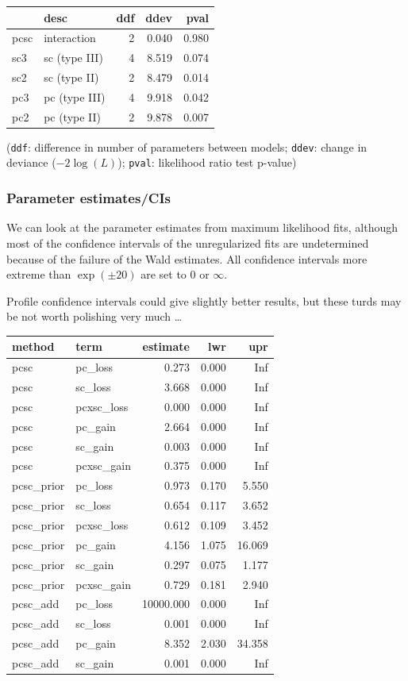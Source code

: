 \documentclass[
]{article}
\begin{document}
\begin{longtable}[]{@{}llrrr@{}}
\toprule()
& desc & ddf & ddev & pval \\
\midrule()
\endhead
pcsc & interaction & 2 & 0.040 & 0.980 \\
sc3 & sc (type III) & 4 & 8.519 & 0.074 \\
sc2 & sc (type II) & 2 & 8.479 & 0.014 \\
pc3 & pc (type III) & 4 & 9.918 & 0.042 \\
pc2 & pc (type II) & 2 & 9.878 & 0.007 \\
\bottomrule()
\end{longtable}

(\texttt{ddf}: difference in number of parameters between models;
\texttt{ddev}: change in deviance (\(-2 \log(L)\)); \texttt{pval}:
likelihood ratio test p-value)

\hypertarget{parameter-estimatescis}{%
\subsubsection{Parameter estimates/CIs}\label{parameter-estimatescis}}

We can look at the parameter estimates from maximum likelihood fits,
although most of the confidence intervals of the unregularized fits are
undetermined because of the failure of the Wald estimates. All
confidence intervals more extreme than \(\exp(\pm 20)\) are set to 0 or
\(\infty\).

Profile confidence intervals could give slightly better results, but
these turds may be not worth polishing very much \ldots{}

\begin{longtable}[]{@{}llrrr@{}}
\toprule()
method & term & estimate & lwr & upr \\
\midrule()
\endhead
pcsc & pc\_loss & 0.273 & 0.000 & Inf \\
pcsc & sc\_loss & 3.668 & 0.000 & Inf \\
pcsc & pcxsc\_loss & 0.000 & 0.000 & Inf \\
pcsc & pc\_gain & 2.664 & 0.000 & Inf \\
pcsc & sc\_gain & 0.003 & 0.000 & Inf \\
pcsc & pcxsc\_gain & 0.375 & 0.000 & Inf \\
pcsc\_prior & pc\_loss & 0.973 & 0.170 & 5.550 \\
pcsc\_prior & sc\_loss & 0.654 & 0.117 & 3.652 \\
pcsc\_prior & pcxsc\_loss & 0.612 & 0.109 & 3.452 \\
pcsc\_prior & pc\_gain & 4.156 & 1.075 & 16.069 \\
pcsc\_prior & sc\_gain & 0.297 & 0.075 & 1.177 \\
pcsc\_prior & pcxsc\_gain & 0.729 & 0.181 & 2.940 \\
pcsc\_add & pc\_loss & 10000.000 & 0.000 & Inf \\
pcsc\_add & sc\_loss & 0.001 & 0.000 & Inf \\
pcsc\_add & pc\_gain & 8.352 & 2.030 & 34.358 \\
pcsc\_add & sc\_gain & 0.001 & 0.000 & Inf \\
\bottomrule()
\end{longtable}
\end{document}
